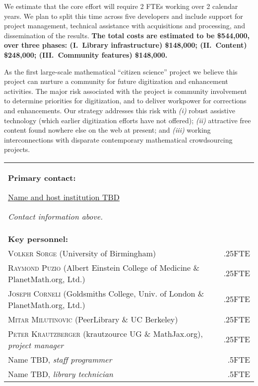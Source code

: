 \documentclass[10pt,letterpaper]{article}
\begin{document}
We estimate that the core effort will require 2 FTEs
working over 2 calendar years.  We plan to split this time
across five developers and include support for project management,
technical assistance with acquisitions and processing, and
dissemination of the results.  \textbf{The total costs are estimated
  to be \$544,000, over three phases: (I.~Library infrastructure)
  \$148,000; (II.~Content) \$248,000; (III.~Community features)
  \$148,000.}

As the first large-scale mathematical ``citizen science'' project we
believe this project can nurture a community for future digitization
and enhancement activities.  The major risk associated with the
project is community involvement to determine priorities for
digitization, and to deliver workpower for corrections and
enhancements.  Our strategy addresses this risk with \emph{(i)} robust
assistive technology (which earlier digitization efforts have not
offered); \emph{(ii)} attractive free content found nowhere else on
the web at present; and \emph{(iii)} working interconnections with
disparate contemporary mathematical crowdsourcing projects.


\bigskip

\begin{tabular}{p{}r}
\textbf{Primary contact:} \par
\ul{Name and host institution TBD}
\par \emph{Contact information above.} &  \\[1cm]
\textbf{Key personnel:} &\\
\textsc{Volker Sorge} (University of Birmingham) &.25FTE \\
\textsc{Raymond Puzio} (Albert Einstein College of Medicine \& PlanetMath.org, Ltd.) & .25FTE \\
\textsc{Joseph Corneli} (Goldsmiths College, Univ. of London \& PlanetMath.org, Ltd.) &.25FTE \\
\textsc{Mitar Milutinovic} (PeerLibrary \& UC Berkeley)  &.25FTE \\
\textsc{Peter Krautzberger} (krautzource UG \& MathJax.org), \emph{project manager}&.25FTE\\
Name TBD, \emph{staff programmer}   &.5FTE \\
Name TBD, \emph{library technician}  &.5FTE \\
\end{tabular}
\end{document}
